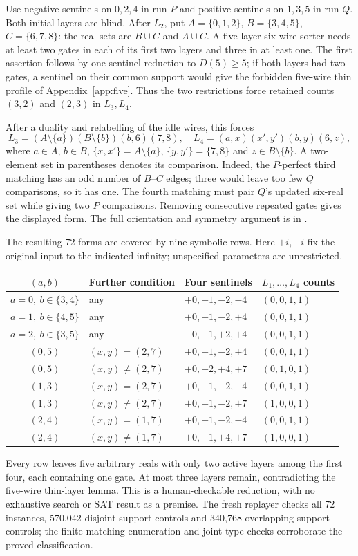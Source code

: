 \documentclass[11pt]{article}
\newcommand{\file}[1]{\path{#1}}
\begin{document}
Use negative sentinels on $0,2,4$ in run $P$ and positive sentinels on $1,3,5$ in run $Q$. Both initial layers are blind. After $L_2$, put $A=\{0,1,2\}$, $B=\{3,4,5\}$, $C=\{6,7,8\}$: the real sets are $B\cup C$ and $A\cup C$. A five-layer six-wire sorter needs at least two gates in each of its first two layers and three in at least one. The first assertion follows by one-sentinel reduction to $D(5)\ge5$; if both layers had two gates, a sentinel on their common support would give the forbidden five-wire thin profile of Appendix~\ref{app:five}. Thus the two restrictions force retained counts $(3,2)$ and $(2,3)$ in $L_3,L_4$.

After a duality and relabelling of the idle wires, this forces
\[
L_3=(A\setminus\{a\})(B\setminus\{b\})(b,6)(7,8),\quad
L_4=(a,x)(x',y')(b,y)(6,z),
\]
where $a\in A$, $b\in B$, $\{x,x'\}=A\setminus\{a\}$, $\{y,y'\}=\{7,8\}$ and $z\in B\setminus\{b\}$. A two-element set in parentheses denotes its comparison. Indeed, the $P$-perfect third matching has an odd number of $B$--$C$ edges; three would leave too few $Q$ comparisons, so it has one. The fourth matching must pair $Q$'s updated six-real set while giving two $P$ comparisons. Removing consecutive repeated gates gives the displayed form. The full orientation and symmetry argument is in \file{depth-hand-proofs/h9-cycle-case.md}.

The resulting 72 forms are covered by nine symbolic rows. Here $+i,-i$ fix the original input to the indicated infinity; unspecified parameters are unrestricted.
\begin{center}\small
\begin{tabular}{clll}
\toprule $(a,b)$ & Further condition & Four sentinels & $L_1,\ldots,L_4$ counts\\\midrule
$a=0,\ b\in\{3,4\}$ & any & $+0,+1,-2,-4$ & $(0,0,1,1)$\\
$a=1,\ b\in\{4,5\}$ & any & $+0,-1,-2,+4$ & $(0,0,1,1)$\\
$a=2,\ b\in\{3,5\}$ & any & $-0,-1,+2,+4$ & $(0,0,1,1)$\\
$(0,5)$ & $(x,y)=(2,7)$ & $+0,-1,-2,+4$ & $(0,0,1,1)$\\
$(0,5)$ & $(x,y)\ne(2,7)$ & $+0,-2,+4,+7$ & $(0,1,0,1)$\\
$(1,3)$ & $(x,y)=(2,7)$ & $+0,+1,-2,-4$ & $(0,0,1,1)$\\
$(1,3)$ & $(x,y)\ne(2,7)$ & $+0,+1,-2,+7$ & $(1,0,0,1)$\\
$(2,4)$ & $(x,y)=(1,7)$ & $+0,+1,-2,-4$ & $(0,0,1,1)$\\
$(2,4)$ & $(x,y)\ne(1,7)$ & $+0,-1,+4,+7$ & $(1,0,0,1)$\\\bottomrule
\end{tabular}\end{center}
Every row leaves five arbitrary reals with only two active layers among the first four, each containing one gate. At most three layers remain, contradicting the five-wire thin-layer lemma. This is a human-checkable reduction, with no exhaustive search or SAT result as a premise. The fresh replayer checks all 72 instances, 570,042 disjoint-support controls and 340,768 overlapping-support controls; the finite matching enumeration and joint-type checks corroborate the proved classification.
\end{document}
